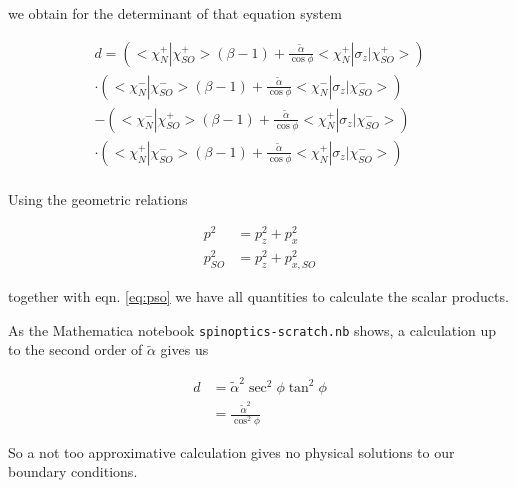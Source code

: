 \documentclass[11pt]{article}
\newcommand{\ta}{\tilde \alpha}
\begin{document}
we obtain for the determinant of that equation system

\begin{align}
    d = \left(<\chi_{N}^+|\chi_{SO}^+>( \beta - 1) +  
            \frac{\ta}{\cos \phi} <\chi_{N}^+|\sigma_z|\chi_{SO}^+>\right) \nonumber \\
        \cdot \left(<\chi_{N}^-|\chi_{SO}^->( \beta - 1) +  
            \frac{\ta}{\cos \phi} <\chi_{N}^-|\sigma_z|\chi_{SO}^->\right) \nonumber \\
     - \left(<\chi_{N}^-|\chi_{SO}^+>( \beta - 1) +  
            \frac{\ta}{\cos \phi} <\chi_{N}^+|\sigma_z|\chi_{SO}^->\right) \nonumber \\
        \cdot \left(<\chi_{N}^+|\chi_{SO}^->( \beta - 1) +  
            \frac{\ta}{\cos \phi} <\chi_{N}^+|\sigma_z|\chi_{SO}^->\right) \nonumber \\
\end{align}


Using the geometric relations

\begin{align}
    p^2         &= p_z^2 + p_x^2\\
    p_{SO}^2    &= p_z^2 + p_{x,SO}^2
\end{align}

together with eqn. \ref{eq:pso} we have all quantities to calculate
the scalar products.

As the Mathematica notebook \texttt{spinoptics-scratch.nb} shows,
a calculation up to the second order of $\ta$ gives us

\begin{align}
    d &= \ta^2 \sec^2 \phi \tan^2 \phi \nonumber\\
      &= \frac{\ta^2}{\cos^2 \phi}
\end{align}

So a not too approximative calculation gives no physical solutions to our boundary conditions.
\end{document}

